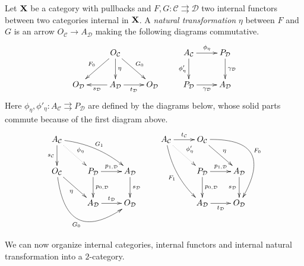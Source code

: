 \documentclass[a4paper,UKenglish,cleveref,pdftex,thm-restate,numberwithinsect]{lipics-v2021}
\def\X{\textbf {\textup{X}}}
\begin{document}
\begin{definition}\label{def:nat}
	Let $\X$ be a category with pullbacks and $F, G\colon \mathcal{C}\rightrightarrows \mathcal{D}$ two internal functors between two categories internal in $\X$. A \emph{natural transformation} $\eta$ between $F$ and $G$ is an arrow $O_\mathcal{C}\to A_{\mathcal{D}}$ making the following diagrams commutative.	
	\[\xymatrix{ & O_{\mathcal{C}} \ar[d]^{\eta} \ar[dr]^{G_0} \ar[dl]_{F_0}  && A_{\mathcal{C}} \ar[r]^{\phi_\eta} \ar[d]_{\phi'_\eta}& P_{\mathcal{D}} \ar[d]^{\gamma_{\mathcal{D}}}\\O_{\mathcal{D}} & A_{\mathcal{D}} \ar[r]_{t_{\mathcal{D}}} \ar[l]^{s_{\mathcal{D}}}& O_{\mathcal{D}} & P_{\mathcal{D}} \ar[r]_{\gamma_{\mathcal{D}}}& A_{\mathcal{D}} } \]
Here $\phi_\eta, \phi'_\eta \colon A_{\mathcal{C}}\rightrightarrows P_{\mathcal{D}}$ are defined by the diagrams below, whose solid parts commute because of the first diagram above.
\[\xymatrix{A_{\mathcal{C}} \ar@{.>}[dr]^{\phi_\eta} \ar[d]_{s_{\mathcal{C}}} \ar@/^.3cm/[drr]^{G_1}&&& A_{\mathcal{C}} \ar@{.>}[dr]^{\phi'_\eta} \ar[r]^{t_{\mathcal{C}}} \ar@/_.3cm/[ddr]_{F_1} & O_{\mathcal{C}} \ar[dr]^{\eta} \ar@/^1.5cm/[ddr]^{F_0}\\ O_{\mathcal{C}} \ar[dr]_{\eta}  \ar@/_1.5cm/[drr]_{G_0}& P_{\mathcal{D}} \ar[r]^{p_{1, \mathcal{D}}} \ar[d]^{p_{0, \mathcal{D}}} & A_{\mathcal{D}} \ar[d]^{s_{\mathcal{D}}} &  & P_{\mathcal{D}} \ar[r]^{p_{1, \mathcal{D}}} \ar[d]^{p_{0, \mathcal{D}}} & A_{\mathcal{D}} \ar[d]_{s_{\mathcal{D}}} \\ & A_{\mathcal{D}} \ar[r]^{t_{\mathcal{D}}}& O_{\mathcal{D}}  & & A_{\mathcal{D}} \ar[r]_{t_{\mathcal{D}}}& O_{\mathcal{D}} }\]
\end{definition}

We can  now organize internal categories, internal functors and internal natural transformation into a $2$-category.
\end{document}
